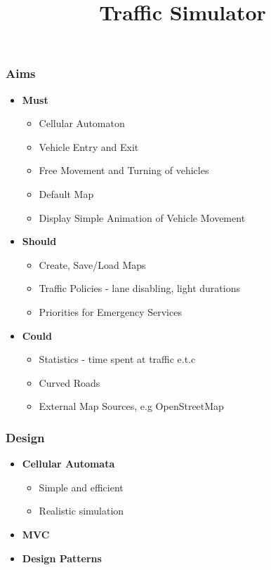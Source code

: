 \documentclass{beamer}
\author[Team LondonSW]
{%
   \texorpdfstring{
        \begin{columns}
            \column{.30\linewidth}
            \RBox{ Violetta Avkhukova}
        \end{columns}
        \begin{columns}
            \column{.30\linewidth}
            \RBox{Yakubu Aliyu Doma}
        \end{columns}
        \begin{columns}
            \column{.30\linewidth}
            \RBox{Rawan Mohammed Alrahili}
        \end{columns}
        \begin{columns}
            \column{.30\linewidth}
            \RBox{Felix Santiago Anda Basabe}
        \end{columns}
        \begin{columns}
            \column{.30\linewidth}
            \RBox{Jia Liu}
        \end{columns}
        \vspace{-0.3cm}
        \begin{columns}
          \column{0.3\linewidth}
          \raggedleft
           \texttt{[image: logo\_map]}
            \vspace{-3 cm}
            \column{0.6\linewidth}
            \raggedright
            \textbf{7CCSMGPR}\\
            \vspace{-4.8cm}
        \end{columns}
   }
   {}
}
\title{Traffic Simulator}
\begin{document}
\begin{frame}
\titlepage
\end{frame}

  
  \begin{frame}
\frametitle{Aims}
   \begin{itemize}
	\item \textbf{Must}
			\begin{itemize}
			\item{Cellular Automaton}
			\item{Vehicle Entry and Exit}
			\item{ Free Movement and Turning of vehicles}
			\item{Default Map}
			\item{Display Simple Animation of Vehicle Movement}	
		\end{itemize}	
	\item \textbf{Should}
			\begin{itemize}
			\item{Create, Save/Load Maps}
			\item{Traffic Policies - lane disabling, light durations}
			\item{Priorities for  Emergency Services}
		\end{itemize}
\item \textbf{Could}
			\begin{itemize}
			\item{Statistics - time spent at traffic e.t.c}
			\item{Curved Roads}
			\item{External Map Sources, e.g OpenStreetMap}
		\end{itemize}	
	\end{itemize}	
  \end{frame}
  
  \begin{frame}
    \frametitle{Design}
       \begin{itemize}
	    \item \textbf{Cellular Automata}
			\begin{itemize}
			\item{Simple and efficient}
			\item{Realistic simulation}
		\end{itemize}
	\end{itemize}
	
	\begin{itemize}
	\item \textbf{MVC}
	\end{itemize}

	\begin{itemize}
	\item \textbf{Design Patterns}
	\end{itemize}

	
  \end{frame}
  
\end{document}
